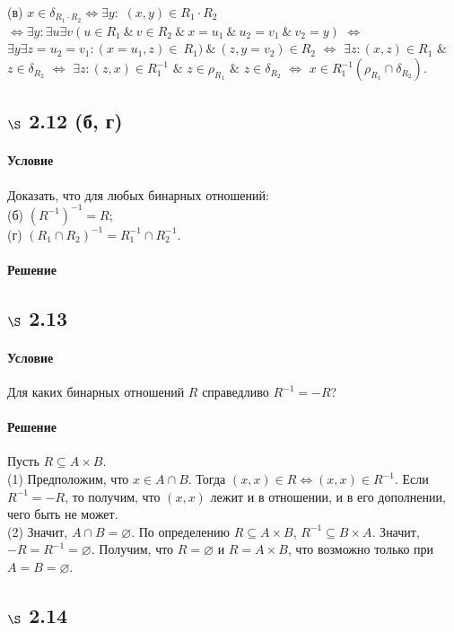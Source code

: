 \documentclass[a4paper,12pt]{article}
\begin{document}
\bigskip

(в) $x\in \delta_{R_1\cdot R_2} \Leftrightarrow \exists y:$ $(x,y)\in R_1\cdot R_2$
 $\Leftrightarrow \exists y: \exists u \exists v (u\in R_1 \ \& \ v\in R_2 \ \& \ x=u_1 \ \& \ u_2 = v_1 \ \& \ v_2 = y)$ $\Leftrightarrow$ $\exists y \exists z=u_2=v_1: (x=u_1,z)\in~R_1) \ \& \ (z,y=v_2)\in R_2$ $\Leftrightarrow$ $\exists z: (x,z)\in R_1$ $\&$ $z\in \delta_{R_2}$ $\Leftrightarrow$ $\exists z: (z,x)\in R_1^{-1}$ $\&$ $z\in \rho_{R_1}$ $\&$ $z\in \delta_{R_2}$ $\Leftrightarrow$ $x\in R_1^{-1} (\rho_{R_1} \cap \delta_{R_2})$.
\subsection*{$\S$ 2.12 (б, г)}
\paragraph*{Условие}
Доказать, что для любых бинарных отношений:\\
(б) $(R^{-1})^{-1} = R$; \\
(г) $(R_1 \cap R_2)^{-1} = R_1^{-1} \cap R_2^{-1}$.
\paragraph*{Решение}
\subsection*{$\S$ 2.13}
\paragraph*{Условие}
Для каких бинарных отношений $R$ справедливо $R^{-1} = -R$?
\paragraph*{Решение}
Пусть $R \subseteq A\times B$. \\
(1) Предположим, что $x\in A \cap B$. Тогда $(x,x) \in R \Leftrightarrow (x,x) \in R^{-1}$. Если $R^{-1} = -R$, то получим, что $(x,x)$ лежит и в отношении, и в его дополнении, чего быть не может.\\
(2) Значит, $A \cap B=\varnothing$. По определению $R \subseteq A\times B$, $R^{-1} \subseteq B\times A$. Значит, $-R=R^{-1}=\varnothing$. Получим, что $R=\varnothing$ и $R=A\times B$, что возможно только при $A=B=\varnothing$.
\subsection*{$\S$ 2.14}
\end{document}
